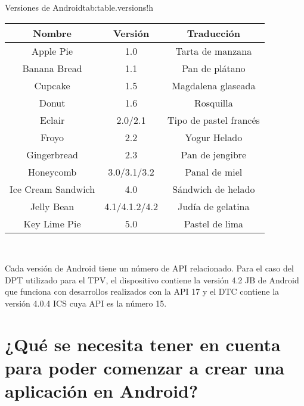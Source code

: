 \begin{tablaob}{Versiones de Android}{tab:table.versions}{!h}
     \begin{tabular}{|c|c|c|}
          \hline
          \textbf{Nombre}&\textbf{Versi\'on}&\textbf{Traducci\'on}\\
          \hline\hline
           Apple Pie & 1.0 & Tarta de manzana\\\hline
           Banana Bread & 1.1 & Pan de pl\'atano\\\hline
           Cupcake & 1.5 & Magdalena glaseada\\\hline
           Donut & 1.6 & Rosquilla\\\hline
           Eclair & 2.0/2.1 & Tipo de pastel franc\'es\\\hline
           Froyo & 2.2 & Yogur Helado\\\hline
           Gingerbread & 2.3 & Pan de jengibre \\\hline
           Honeycomb & 3.0/3.1/3.2 & Panal de miel\\\hline
           Ice Cream Sandwich & 4.0 & S\'andwich de helado\\\hline
           Jelly Bean & 4.1/4.1.2/4.2 & Jud\'ia de gelatina\\\hline
           Key Lime Pie & 5.0 & Pastel de lima\\\hline
     \end{tabular}\\[5mm]
\end{tablaob}



Cada versi\'on de Android tiene un n\'umero de \ac{API} relacionado. Para el caso del \ac{DPT} utilizado para el \ac{TPV}, el dispositivo contiene la versi\'on 4.2 \ac{JB} de Android que funciona con desarrollos realizados con la \ac{API} 17 y el \ac{DTC} contiene la versi\'on 4.0.4 \ac{ICS} cuya \ac{API} es la n\'umero 15.


\section{¿Qu\'e se necesita tener en cuenta para poder comenzar a crear una aplicaci\'on en Android?}
\label{sec:android.whatYouNeed.1}


